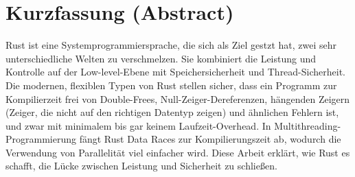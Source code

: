 \chapter*{Kurzfassung (Abstract)}

Rust ist eine Systemprogrammiersprache, die sich als Ziel gestzt hat, zwei sehr unterschiedliche Welten zu verschmelzen. Sie kombiniert die Leistung und Kontrolle auf der Low-level-Ebene mit Speichersicherheit und Thread-Sicherheit. Die modernen, flexiblen Typen von Rust stellen sicher, dass ein Programm zur Kompilierzeit frei von Double-Frees, Null-Zeiger-Dereferenzen, hängenden Zeigern (Zeiger, die nicht auf den richtigen Datentyp zeigen) und ähnlichen Fehlern ist, und zwar mit minimalem bis gar keinem Laufzeit-Overhead. In Multithreading-Programmierung fängt Rust Data Races zur Kompilierungszeit ab, wodurch die Verwendung von Parallelität viel einfacher wird. Diese Arbeit erklärt, wie Rust es schafft, die Lücke zwischen Leistung und Sicherheit zu schließen. 
